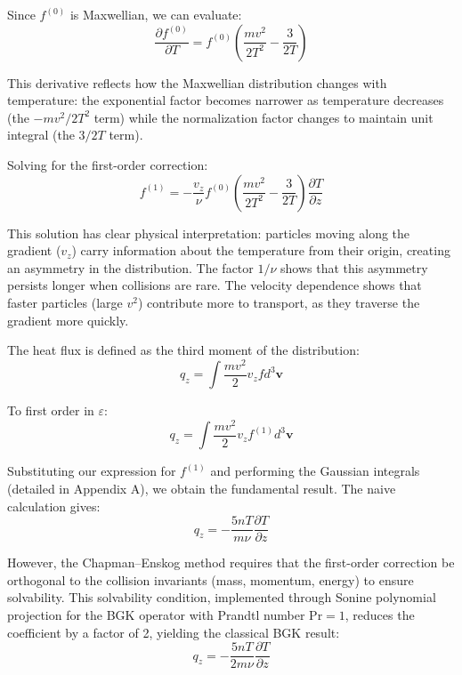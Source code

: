 \documentclass[12pt,a4paper]{article}
\newcommand{\vect}[1]{\mathbf{#1}}
\begin{document}
Since $f^{(0)}$ is Maxwellian, we can evaluate:
\begin{equation}
\frac{\partial f^{(0)}}{\partial T} = f^{(0)} \left(\frac{mv^2}{2T^2} - \frac{3}{2T}\right)
\label{eq:maxwellian_derivative}
\end{equation}

This derivative reflects how the Maxwellian distribution changes with temperature: the exponential factor becomes narrower as temperature decreases (the $-mv^2/2T^2$ term) while the normalization factor changes to maintain unit integral (the $3/2T$ term).

Solving for the first-order correction:
\begin{equation}
f^{(1)} = -\frac{v_z}{\nu} f^{(0)} \left(\frac{mv^2}{2T^2} - \frac{3}{2T}\right) \frac{\partial T}{\partial z}
\label{eq:first_order_solution}
\end{equation}

This solution has clear physical interpretation: particles moving along the gradient ($v_z$) carry information about the temperature from their origin, creating an asymmetry in the distribution. The factor $1/\nu$ shows that this asymmetry persists longer when collisions are rare. The velocity dependence shows that faster particles (large $v^2$) contribute more to transport, as they traverse the gradient more quickly.

The heat flux is defined as the third moment of the distribution:
\begin{equation}
q_z = \int \frac{mv^2}{2} v_z f d^3\vect{v}
\label{eq:heat_flux_definition}
\end{equation}

To first order in $\varepsilon$:
\begin{equation}
q_z = \int \frac{mv^2}{2} v_z f^{(1)} d^3\vect{v}
\label{eq:heat_flux_first_order}
\end{equation}

Substituting our expression for $f^{(1)}$ and performing the Gaussian integrals (detailed in Appendix A), we obtain the fundamental result. The naive calculation gives:
\begin{equation}
\boxed{q_z = -\frac{5nT}{m\nu} \frac{\partial T}{\partial z}}
\label{eq:heat_flux_naive}
\end{equation}

However, the Chapman--Enskog method requires that the first-order correction be orthogonal to the collision invariants (mass, momentum, energy) to ensure solvability. This solvability condition, implemented through Sonine polynomial projection for the BGK operator with Prandtl number $\text{Pr} = 1$, reduces the coefficient by a factor of 2, yielding the classical BGK result:
\begin{equation}
\boxed{q_z = -\frac{5nT}{2m\nu} \frac{\partial T}{\partial z}}
\label{eq:heat_flux_bgk}
\end{equation}
\end{document}
